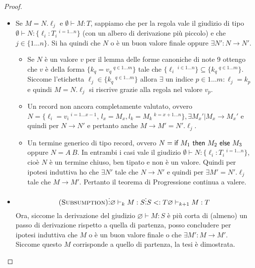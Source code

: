 \begin{proof}
\begin{itemize}
\begin{itemize}
		\item {} Se $M = N.\ell_j$ e $\emptyset \vdash M : T$, sappiamo che per la regola  vale il giudizio di tipo $\emptyset \vdash N : \{ \ell_i : T_i \:^{i = 1 \ldots n}\}$ (con un albero di derivazione pi\`u piccolo) e che $j \in \{1 \ldots n\}$.
		Si ha quindi che $N$ o \`e un buon valore finale oppure $\exists N' : N \longrightarrow N'$.
		\begin{itemize}
			\item Se $N$ \`e un valore $v$ per il lemma delle forme canoniche di note 9 ottengo che
			$v$ \`e della forma $\{k_q = v_q \:^{q \in 1 \dots m} \}$ tale che $\{\ell_i\ ^{i \in 1 \dots n} \} \subseteq \{k_q\ ^{q \in 1 \dots m}\}$.
			Siccome l'etichetta $\ell_j \in \{k_q\ ^ {q \in 1 \dots m}\}$ allora $\exists$ un indice $p \in 1 \dots m : \ell_j = k_p$ e quindi $M = N.\ell_j$ si riscrive grazie alla regola  nel valore $v_p$.
			
			\item Un record non ancora completamente valutato, ovvero $N = \{ \ell_i = v_i \:^{i = 1 \ldots x-1}$, $ l_x = M_x, l_k = M_k \:^{k = x+1\ldots n}\}, \exists M_x'| M_x \to M_x'$ e quindi per  $N \to N'$ e pertanto anche $M \to M' = N'.\ell_j$.
			
			\item Un termine generico di tipo record, ovvero $N = \IF{M_1}{M_2}{M_3}$ oppure $N = A \: B$. In entrambi i casi vale il giudizio $\emptyset \vdash N : \{ \ell_i : T_i \:^{i = 1 \ldots n}\}$, cio\`e $N$ \`e un termine chiuso, ben tipato e non \`e un valore. 
			Quindi per ipotesi induttiva ho che $\exists N'$ tale che $N \to N'$ e quindi per  $\exists M' = N'.\ell_j$ tale che $M \to M'$.
			Pertanto il teorema di Progressione continua a valere.
			
		\end{itemize}
		
		
		
		
		\item {}
		$$
		{\textsc{(Subsumption)}}
		{
			{}
			{\vdots}
			{\varnothing \vdash_{k} M : S}
		}
		{
			{}
			{\vdots}
			{S <: T}
		}
		{\varnothing \vdash_{k+1} M : T}
		$$
		Ora, siccome la derivazione del giudizio $\varnothing \vdash M  : S$ \`e pi\`u
		corta di (almeno) un passo di derivazione rispetto a quella di partenza,
		posso concludere per ipotesi induttiva che $M$ o \`e un buon valore finale o
		che $\exists M': M \longrightarrow M'$. Siccome questo $M$ corrisponde a
		quello di partenza, la tesi \`e dimostrata.

	\end{itemize}

\end{itemize}
\end{proof}

